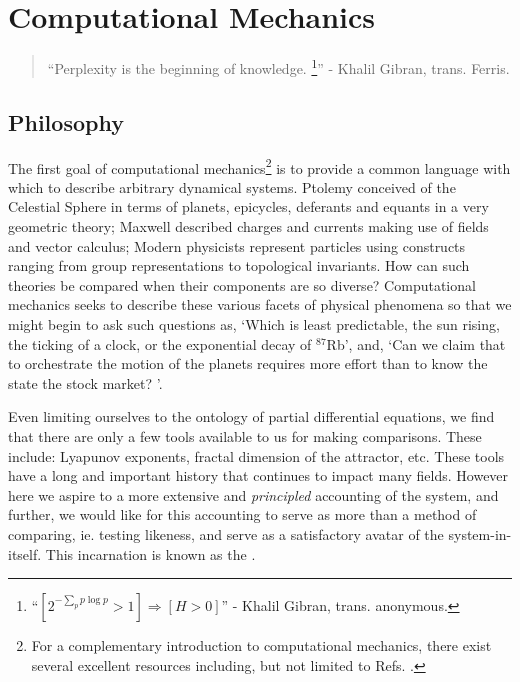 \ifx\master\undefined\fi

\chapter{Computational Mechanics}
\label{ch:compmech}

\begin{quote}
\centering
``Perplexity is the beginning of knowledge. \footnote{``$[2^{-\sum_p{p \log{p}}}>1] \Rightarrow [H>0]$'' - Khalil Gibran, trans. anonymous.}'' - Khalil Gibran, trans. Ferris.
\end{quote}

\section{Philosophy}
\label{sec:philosophy}
The first goal of computational mechanics\footnote{For a complementary introduction to computational mechanics, there exist several excellent resources including, but not limited to Refs. .} is to provide a common language with which to describe arbitrary dynamical systems. Ptolemy conceived of the Celestial Sphere in terms of planets, epicycles, deferants and equants in a very geometric theory; Maxwell described charges and currents making use of fields and vector calculus; Modern physicists represent particles using constructs ranging from group representations to topological invariants. How can such theories be compared when their components are so diverse? Computational mechanics seeks to describe these various facets of physical phenomena so that we might begin to ask such questions as, `Which is least predictable, the sun rising, the ticking of a clock, or the exponential decay of $^{87}$Rb', and, `Can we claim that to orchestrate the motion of the planets requires more effort than to know the state the stock market? '.

Even limiting ourselves to the ontology of partial differential equations, we find that there are only a few tools available to us for making comparisons. These include: Lyapunov exponents, fractal dimension of the attractor, etc. These tools have a long and important history that continues to impact many fields. However here we aspire to a more extensive and \emph{principled} accounting of the system, and further, we would like for this accounting to serve as more than a method of comparing, ie. testing likeness, and serve as a satisfactory avatar of the system-in-itself. This incarnation is known as the \eM.

